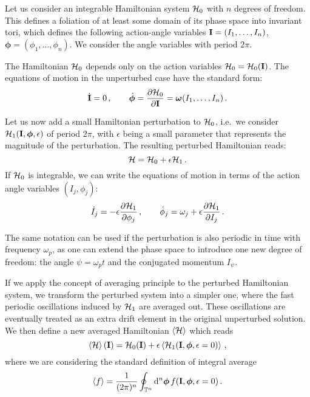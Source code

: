 Let us consider an integrable Hamiltonian system $\mathcal{H}_0$ with $n$ degrees of freedom. This defines a foliation of at least some domain of its phase space into invariant tori, which defines the following action-angle variables $\vb{I}=(I_1, \ldots, I_n)$, $\boldsymbol{\phi}=(\phi_1, \ldots, \phi_n)$. We consider the angle variables with period $2\pi$.

The Hamiltonian $\mathcal{H}_0$ depends only on the action variables $\mathcal{H}_0=\mathcal{H}_0(\vb{I})$. The equations of motion in the unperturbed case have the standard form:
\begin{equation}
    \dot{\vb{I}}=0\,, \qquad \dot{\boldsymbol{\phi}} = \pdv{\mathcal{H}_0}{\vb{I}} = \boldsymbol{\omega}(I_1,\dots,I_n) \,.
\end{equation}

Let us now add a small Hamiltonian perturbation to $\mathcal{H}_0$, i.e.\ we consider $\mathcal{H}_1(\vb{I}, \boldsymbol{\phi}, \epsilon)$ of period $2\pi$, with $\epsilon$ being a small parameter that represents the magnitude of the perturbation. The resulting perturbed Hamiltonian reads:
\begin{equation}
    \mathcal{H} = \mathcal{H}_0 + \epsilon \mathcal{H}_1\,.
\end{equation}
%
If $\mathcal{H}_0$ is integrable, we can write the equations of motion in terms of the action angle variables $(I_j,\phi_j)$:
%
\begin{equation}
    \dot I_j = -\epsilon \pdv{\mathcal{H}_1}{\phi_j}\,,\qquad
	\dot \phi_j = \omega_j + \epsilon \pdv{\mathcal{H}_1}{I_j}\, .
\end{equation}
%

The same notation can be used if the perturbation is also periodic in time with frequency $\omega_p$, as one can extend the phase space to introduce one new degree of freedom: the angle $\psi=\omega_p t$ and the conjugated momentum $I_\psi$.

If we apply the concept of averaging principle to the perturbed Hamiltonian system, we transform the perturbed system into a simpler one, where the fast periodic oscillations induced by $\mathcal{H}_1$ are averaged out. These oscillations are eventually treated as an extra drift element in the original unperturbed solution. We then define a new averaged Hamiltonian $\left<{\mathcal{H}}\right>$ which reads
%
\begin{equation} 
	\left<{\mathcal{H}}\right>(\vb{I}) = \mathcal{H}_0(\vb{I})+\epsilon \left<{ \mathcal{H}_1(\vb{I}, \boldsymbol{\phi}, \epsilon=0) }\right>\,,
\end{equation}
%
where we are considering the standard definition of integral average
%
\begin{equation} 
	\left<{f}\right> = \frac{1}{(2\pi)^n}\oint_{\mathbb{T}^n}\dd^n\boldsymbol{\phi}\, f(\vb{I}, \boldsymbol{\phi}, \epsilon=0) \, .
\end{equation}
%

